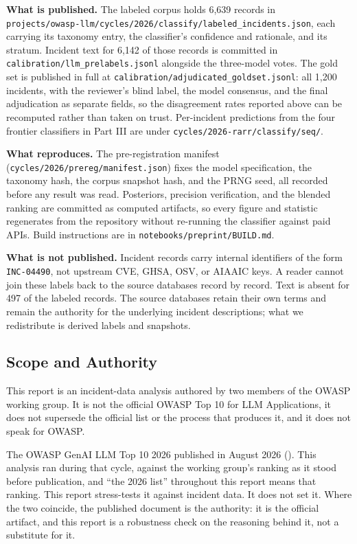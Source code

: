 \documentclass[11pt]{article}
\begin{document}
\textbf{What is published.} The labeled corpus holds 6,639 records in
\texttt{projects/owasp-llm/cycles/2026/classify/labeled\_incidents.json},
each carrying its taxonomy entry, the classifier's confidence and
rationale, and its stratum. Incident text for 6,142 of those records is
committed in \texttt{calibration/llm\_prelabels.jsonl} alongside the
three-model votes. The gold set is published in full at
\texttt{calibration/adjudicated\_goldset.jsonl}: all 1,200 incidents,
with the reviewer's blind label, the model consensus, and the final
adjudication as separate fields, so the disagreement rates reported
above can be recomputed rather than taken on trust. Per-incident
predictions from the four frontier classifiers in Part III are under
\texttt{cycles/2026-rarr/classify/seq/}.

\textbf{What reproduces.} The pre-registration manifest
(\texttt{cycles/2026/prereg/manifest.json}) fixes the model
specification, the taxonomy hash, the corpus snapshot hash, and the PRNG
seed, all recorded before any result was read. Posteriors, precision
verification, and the blended ranking are committed as computed
artifacts, so every figure and statistic regenerates from the repository
without re-running the classifier against paid APIs. Build instructions
are in \texttt{notebooks/preprint/BUILD.md}.

\textbf{What is not published.} Incident records carry internal
identifiers of the form \texttt{INC-04490}, not upstream CVE, GHSA, OSV,
or AIAAIC keys. A reader cannot join these labels back to the source
databases record by record. Text is absent for 497 of the labeled
records. The source databases retain their own terms and remain the
authority for the underlying incident descriptions; what we redistribute
is derived labels and snapshots.

\subsection{Scope and Authority}\label{scope-and-authority}

This report is an incident-data analysis authored by two members of the
OWASP working group. It is not the official OWASP Top 10 for LLM
Applications, it does not supersede the official list or the process
that produces it, and it does not speak for OWASP.

The OWASP GenAI LLM Top 10 2026 published in August 2026
().
This analysis ran during that cycle, against the working group's ranking
as it stood before publication, and ``the 2026 list'' throughout this
report means that ranking. This report stress-tests it against incident
data. It does not set it. Where the two coincide, the published document
is the authority: it is the official artifact, and this report is a
robustness check on the reasoning behind it, not a substitute for it.
\end{document}

